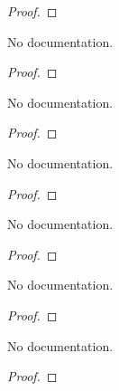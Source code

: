 \begin{proof}
    \leanok
\end{proof}

\begin{theorem}\label{lagrange}
        \leanok
                No documentation.
    \end{theorem}

\begin{proof}
    \leanok
\end{proof}

\begin{lemma}\label{Vert_abs}
        \leanok
                No documentation.
    \end{lemma}

\begin{proof}
    \leanok
\end{proof}

\begin{lemma}\label{Vert_div}
        \leanok
                No documentation.
    \end{lemma}

\begin{proof}
    \leanok
\end{proof}

\begin{lemma}\label{Simplifying₁}
        \leanok
                No documentation.
    \end{lemma}

\begin{proof}
    \leanok
\end{proof}

\begin{lemma}\label{Simplifying₂}
        \leanok
                No documentation.
    \end{lemma}

\begin{proof}
    \leanok
\end{proof}

\begin{lemma}\label{div_div_mul}
        \leanok
                No documentation.
    \end{lemma}

\begin{proof}
    \leanok
\end{proof}


